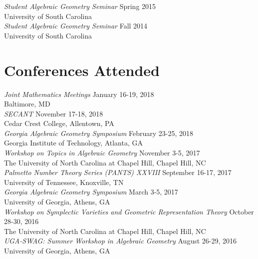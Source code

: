 \documentclass{article}
\begin{document}
\noindent\textsl{Student Algebraic Geometry Seminar} \hfill Spring 2015\\
University of South Carolina\\

\noindent\textsl{Student Algebraic Geometry Seminar} \hfill Fall 2014\\
University of South Carolina

\section*{Conferences Attended}
\noindent\textsl{Joint Mathematics Meetings} \hfill January 16-19, 2018\\
Baltimore, MD\\

\noindent\textsl{SECANT} \hfill November 17-18, 2018\\
Cedar Crest College, Allentown, PA\\

\noindent\textsl{Georgia Algebraic Geometry Symposium} \hfill February 23-25, 2018\\
Georgia Institute of Technology, Atlanta, GA\\

\noindent\textsl{Workshop on Topics in Algebraic Geometry} \hfill November 3-5, 2017\\
The University of North Carolina at Chapel Hill, Chapel Hill, NC\\

\noindent\textsl{Palmetto Number Theory Series (PANTS) XXVIII} \hfill September 16-17, 2017\\
University of Tennessee, Knoxville, TN\\

\noindent\textsl{Georgia Algebraic Geometry Symposium} \hfill March 3-5, 2017\\
University of Georgia, Athens, GA\\

\noindent\textsl{Workshop on Symplectic Varieties and Geometric Representation Theory} \hfill October 28-30, 2016\\
The University of North Carolina at Chapel Hill, Chapel Hill, NC\\

\noindent\textsl{UGA-SWAG: Summer Workshop in Algebraic Geometry} \hfill August 26-29, 2016\\
University of Georgia, Athens, GA\\
\end{document}
